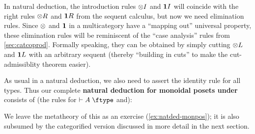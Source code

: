 In natural deduction, the introduction rules $\mathord{\otimes}I$ and $\mathbf{1} I$ will coincide with the right rules $\mathord{\otimes}R$ and $\mathbf{1} R$ from the sequent calculus, but now we need elimination rules.
Since $\otimes$ and $\mathbf{1}$ in a multicategory have a ``mapping out'' universal property, these elimination rules will be reminiscent of the ``case analysis'' rules from \cref{sec:catcoprod}.
Formally speaking, they can be obtained by simply cutting $\mathord{\otimes}L$ and $\mathbf{1} L$ with an arbitrary sequent (thereby ``building in cuts'' to make the cut-admissiblity theorem easier).
As usual in a natural deduction, we also need to assert the identity rule for all types.
Thus our complete \textbf{natural deduction for monoidal posets under \cG} consists of (the rules for $\types A\type$ and):

We leave the metatheory of this as an exercise (\cref{ex:natded-monpos}); it is also subsumed by the categorified version discussed in more detail in the next section.

